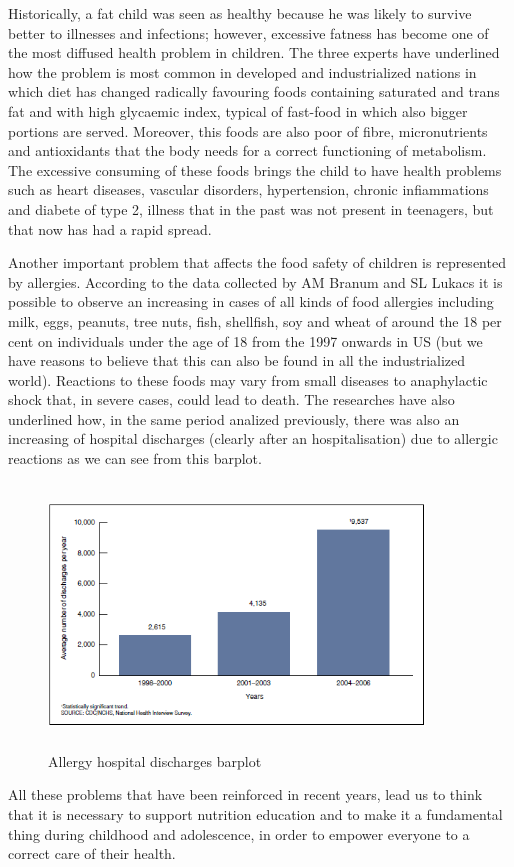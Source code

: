 Historically, a fat child was seen as healthy because he was likely to survive better to illnesses and infections; however, excessive fatness has become one of the most diffused health problem in children. The three experts have underlined how the problem is most common in developed and industrialized nations in which diet has changed radically favouring foods containing saturated and trans fat and with high glycaemic index, typical of fast-food in which also bigger portions are served. Moreover, this foods are also poor of fibre, micronutrients and antioxidants that the body needs for a correct functioning of metabolism. The excessive consuming of these foods brings the child to have health problems such as heart diseases, vascular disorders, hypertension, chronic infiammations and diabete of type 2, illness that in the past was not present in teenagers, but that now has had a rapid spread.\linebreak 

Another important problem that affects the food safety of children is represented by allergies.
According to the data collected by AM Branum and SL Lukacs \cite{FoodallergyUSchildren} it is possible to observe an increasing in cases of all kinds of food allergies including milk, eggs, peanuts, tree nuts, fish, shellfish, soy and wheat of around the 18 per cent on individuals under the age of 18 from the 1997 onwards in US (but we have reasons to believe that this can also be found in all the industrialized world). Reactions to these foods may vary from small diseases to anaphylactic shock that, in severe cases, could lead to death.
The researches have also underlined how, in the same period analized previously, there was also an increasing of hospital discharges (clearly after an hospitalisation) due to allergic reactions as we can see from this barplot.
\begin{figure}[H]
\centering
\includegraphics[width=10cm, height=7cm]{immagini/allergybarplot.png}
\caption{Allergy hospital discharges barplot}\label{fig:allergybarplot}
\end{figure}
All these problems that have been reinforced in recent years, lead us to think that it is necessary to support nutrition education and to make it a fundamental thing during childhood and adolescence, in order to empower everyone to a correct care of their health.

